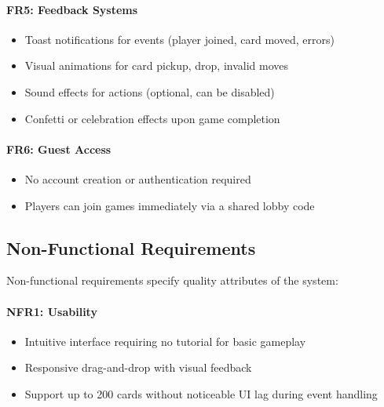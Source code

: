 \paragraph*{FR5: Feedback Systems}
\begin{itemize}
    \item Toast notifications for events (player joined, card moved, errors)
    \item Visual animations for card pickup, drop, invalid moves
    \item Sound effects for actions (optional, can be disabled)
    \item Confetti or celebration effects upon game completion
\end{itemize}

\paragraph*{FR6: Guest Access}
\begin{itemize}
    \item No account creation or authentication required
    \item Players can join games immediately via a shared lobby code
\end{itemize}

\subsection{Non-Functional Requirements}
\label{subsec:non-functional-requirements}

Non-functional requirements specify quality attributes of the system:

\paragraph*{NFR1: Usability}
\begin{itemize}
    \item Intuitive interface requiring no tutorial for basic gameplay
    \item Responsive drag-and-drop with visual feedback
    \item Support up to 200 cards without noticeable UI lag during event handling
\end{itemize}

